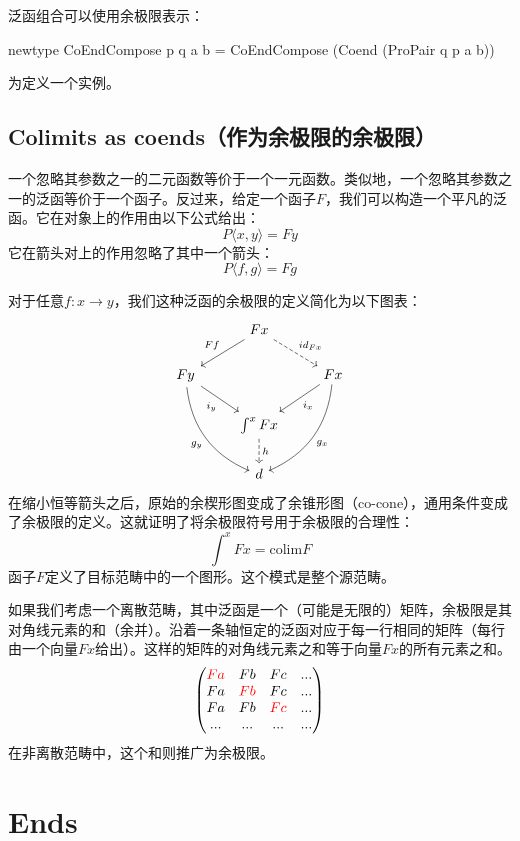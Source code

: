 \documentclass[DaoFP]{subfiles}
\begin{document}
 \begin{exercise}
  泛函组合可以使用余极限表示：
  \begin{haskell}
   newtype CoEndCompose p q a b = CoEndCompose (Coend (ProPair q p a b))
  \end{haskell}
  为定义一个实例。
 \end{exercise}

 \subsection{Colimits as coends（作为余极限的余极限）}
 一个忽略其参数之一的二元函数等价于一个一元函数。类似地，一个忽略其参数之一的泛函等价于一个函子。反过来，给定一个函子$F$，我们可以构造一个平凡的泛函。它在对象上的作用由以下公式给出：
 \[P \langle x, y \rangle = F y \]
 它在箭头对上的作用忽略了其中一个箭头：
 \[P \langle f, g \rangle = F g \]

 对于任意$f \colon x \to y$，我们这种泛函的余极限的定义简化为以下图表：
 \[
  \begin{tikzcd}
   & F x
   \arrow[ld, "F f"']
   \arrow[rd, dashed, "id_{F x}"]
   \\
   F y
   \arrow[dr, "i_y"']
   \arrow[ddr, bend right,  "g_y"']
   && F x
   \arrow[dl, "i_x"]
   \arrow[ddl, bend left,  "g_x"]
   \\
   &\int^x F x
   \arrow[d, dashed, "h"]
   \\
   &d
  \end{tikzcd}
 \]
 在缩小恒等箭头之后，原始的余楔形图变成了余锥形图（co-cone），通用条件变成了余极限的定义。这就证明了将余极限符号用于余极限的合理性：
 \[ \int^x F x = \text{colim} F \]
 函子$F$定义了目标范畴中的一个图形。这个模式是整个源范畴。

 如果我们考虑一个离散范畴，其中泛函是一个（可能是无限的）矩阵，余极限是其对角线元素的和（余并）。沿着一条轴恒定的泛函对应于每一行相同的矩阵（每行由一个向量$F x$给出）。这样的矩阵的对角线元素之和等于向量$F x$的所有元素之和。
 \[
  \begin{pmatrix}
   \color{red} F a & F b & F c & ... \\
   F a & \color{red}F b & F c & ...\\
   F a & F b &\color{red}F c & ...\\
   ... & ... & ... & ...
  \end{pmatrix}
 \]
 在非离散范畴中，这个和则推广为余极限。


\section{Ends}
\end{document}
